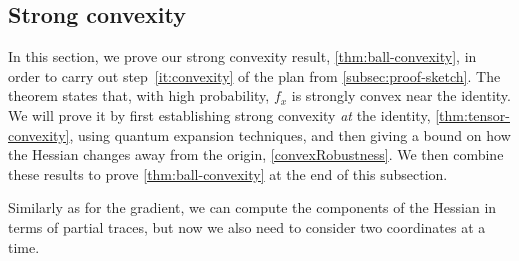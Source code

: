 \documentclass[aos]{imsart}
\theoremstyle{definition}
\numberwithin{equation}{section}
\DeclareMathOperator{\tr}{Tr}
\newcommand{\ot}{\otimes}
\begin{document}
\subsection{Strong convexity}\label{subsec:strong-convex}
In this section, we prove our strong convexity result, \cref{thm:ball-convexity}, in order to carry out step~\ref{it:convexity} of the plan from \cref{subsec:proof-sketch}.
The theorem states that, with high probability, $f_x$ is strongly convex near the identity.
We will prove it by first establishing strong convexity \emph{at} the identity, \cref{thm:tensor-convexity}, using quantum expansion techniques, and then giving a bound on how the Hessian changes away from the origin, \cref{convexRobustness}.
We then combine these results to prove \cref{thm:ball-convexity} at the end of this subsection.

Similarly as for the gradient, we can compute the components of the Hessian in terms of partial traces, but now we also need to consider two coordinates at a time.

\end{document}
